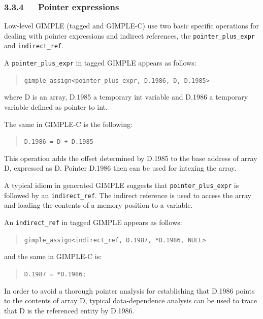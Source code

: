\documentclass[a4paper]{article}
\begin{document}
\subsubsection{3.3.4~~~Pointer expressions%
  \label{pointer-expressions}%
}

Low-level GIMPLE (tagged and GIMPLE-C) use two basic specific operations for
dealing with pointer expressions and indirect references, the
\texttt{pointer\_plus\_expr} and \texttt{indirect\_ref}.

A \texttt{pointer\_plus\_expr} in tagged GIMPLE appears as follows:
%
\begin{quote}

\texttt{gimple\_assign<pointer\_plus\_expr, D.1986, D, D.1985>}

\end{quote}

where D is an array, D.1985 a temporary int variable and D.1986 a temporary
variable defined as pointer to int.

The same in GIMPLE-C is the following:
%
\begin{quote}

\texttt{D.1986 = D + D.1985}

\end{quote}

This operation adds the offset determined by D.1985 to the base address of array
D, expressed as D. Pointer D.1986 then can be used for intexing the array.

A typical idiom in generated GIMPLE suggests that \texttt{pointer\_plus\_expr} is
followed by an \texttt{indirect\_ref}. The indirect reference is used to access
the array and loading the contents of a memory position to a variable.

An \texttt{indirect\_ref} in tagged GIMPLE appears as follows:
%
\begin{quote}

\texttt{gimple\_assign<indirect\_ref, D.1987, *D.1986, NULL>}

\end{quote}

and the same in GIMPLE-C is:
%
\begin{quote}

\texttt{D.1987 = *D.1986;}

\end{quote}

In order to avoid a thorough pointer analysis for establishing that
D.1986 points to the contents of array D, typical data-dependence
analysis can be used to trace that D is the referenced entity by D.1986.
\end{document}
